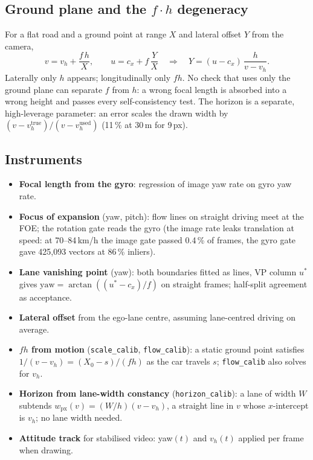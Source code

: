 \documentclass[10pt,a4paper]{article}
\begin{document}
\subsection{Ground plane and the $f\!\cdot\!h$ degeneracy}
For a flat road and a ground point at range $X$ and lateral offset $Y$ from the camera,
\begin{equation}
v = v_h + \frac{f\,h}{X}, \qquad u = c_x + f\,\frac{Y}{X}
\quad\Longrightarrow\quad
Y = (u - c_x)\,\frac{h}{v - v_h}.
\label{eq:ground}
\end{equation}
Laterally only $h$ appears; longitudinally only $fh$. No check that uses only the ground plane can
separate $f$ from $h$: a wrong focal length is absorbed into a wrong height and passes every
self-consistency test. The horizon is a separate, high-leverage parameter: an error scales the drawn
width by $(v - v_h^\text{true})/(v - v_h^\text{used})$ (11\,\% at 30\,m for 9\,px).

\subsection{Instruments}
\begin{itemize}
\item \textbf{Focal length from the gyro}: regression of image yaw rate on gyro yaw rate.
\item \textbf{Focus of expansion} (yaw, pitch): flow lines on straight driving meet at the FOE; the rotation
  gate reads the gyro (the image rate leaks translation at speed: at 70--84\,km/h the image gate passed
  0.4\,\% of frames, the gyro gate gave 425{,}093 vectors at 86\,\% inliers).
\item \textbf{Lane vanishing point} (yaw): both boundaries fitted as lines, VP column $u^\ast$ gives
  $\text{yaw} = \arctan((u^\ast - c_x)/f)$ on straight frames; half-split agreement as acceptance.
\item \textbf{Lateral offset} from the ego-lane centre, assuming lane-centred driving on average.
\item \textbf{$fh$ from motion} (\texttt{scale\_calib}, \texttt{flow\_calib}): a static ground point satisfies
  $1/(v - v_h) = (X_0 - s)/(fh)$ as the car travels $s$; \texttt{flow\_calib} also solves for $v_h$.
\item \textbf{Horizon from lane-width constancy} (\texttt{horizon\_calib}): a lane of width $W$ subtends
  $w_\text{px}(v) = (W/h)(v - v_h)$, a straight line in $v$ whose $x$-intercept is $v_h$; no lane width needed.
\item \textbf{Attitude track} for stabilised video: yaw$(t)$ and $v_h(t)$ applied per frame when drawing.
\end{itemize}
\end{document}
